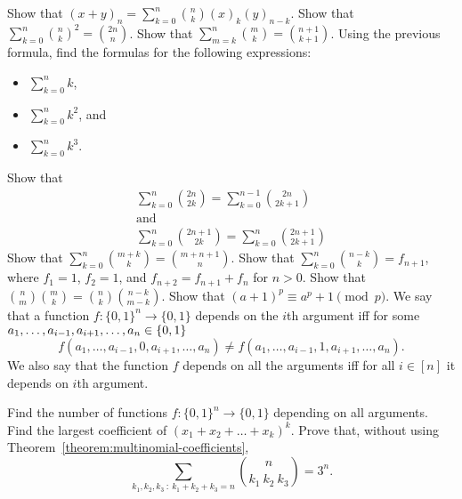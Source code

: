 \begin{chapterendexercises}
  \exercise Show that
    $(x + y)_n = \sum_{k = 0}^n \binom{n}{k} (x)_k (y)_{n - k}$.
  \exercise Show that
    $\sum_{k = 0}^n \binom{n}{k}^2 = \binom{2n}{n}$.
  \exercise Show that $\sum_{m = k}^n \binom{m}{k} =
    \binom{n + 1}{k + 1}$.
  \exercise Using the previous formula, find the formulas for the following
    expressions:
    \begin{itemize}
      \item $\sum_{k = 0}^n k$,
      \item $\sum_{k = 0}^n k^2$, and
      \item $\sum_{k = 0}^n k^3$.
    \end{itemize}
  \exercise Show that
    \begin{gather*}
      \sum_{k = 0}^{n} \binom{2n}{2k} =
      \sum_{k = 0}^{n - 1} \binom{2n}{2k + 1} \\
      \text{and} \\
      \sum_{k = 0}^{n} \binom{2n + 1}{2k} =
      \sum_{k = 0}^n \binom{2n + 1}{2k + 1}
    \end{gather*}
  \exercise Show that $\sum_{k = 0}^n \binom{m + k}{k} =
    \binom{m + n + 1}{n}$.
  \exercise Show that $\sum_{k = 0}^n \binom{n - k}{k} = f_{n + 1}$,
    where $f_1 = 1$, $f_2 = 1$, and $f_{n + 2} = f_{n + 1} + f_n$ for $n > 0$.
  \exercise Show that $\binom{n}{m} \binom{m}{k} =
    \binom{n}{k} \binom{n - k}{m - k}$.
  \exercise Show that
    $(a + 1)^p \equiv a^p + 1 \pmod{p}$.
  \exercise We say that a function $f : \{0, 1\}^n \to \{0, 1\}$ depends on the
    $i$th argument iff for some
    $a_1, \dots, a_{i - 1}, a_{i + 1}, \dots, a_n \in \set{0, 1}$
    \[
      f(a_1, \dots, a_{i - 1}, 0, a_{i + 1}, \dots, a_n) \neq
      f(a_1, \dots, a_{i - 1}, 1, a_{i + 1}, \dots, a_n).
    \]
    We also say that the function $f$ depends on all the arguments iff for all
    $i \in [n]$ it depends on $i$th argument.

    Find the number of functions $f : \{0, 1\}^n \to \{0, 1\}$ depending on all
    arguments.
  \exercise Find the largest coefficient of $(x_1 + x_2 + \dots + x_k)^k$.
  \exercise Prove that,
    without using Theorem~\ref{theorem:multinomial-coefficients},
    \[
      \sum_{k_1, k_2, k_3 ~:~ k_1 + k_2 + k_3 = n} \binom{n}{k_1 \ k_2 \ k_3} =
      3^n.
    \]
\end{chapterendexercises}

